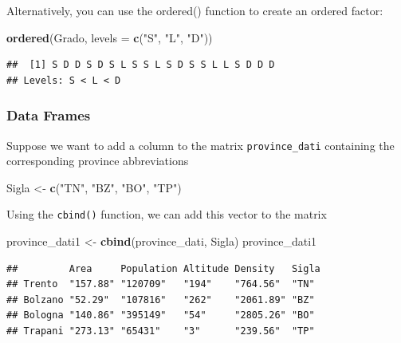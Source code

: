 \documentclass[
]{article}
\newenvironment{Shaded}{\begin{snugshade}}{\end{snugshade}}
\newcommand{\AttributeTok}[1]{\textcolor[rgb]{0.13,0.29,0.53}{#1}}
\newcommand{\FunctionTok}[1]{\textcolor[rgb]{0.13,0.29,0.53}{\textbf{#1}}}
\newcommand{\NormalTok}[1]{#1}
\newcommand{\OtherTok}[1]{\textcolor[rgb]{0.56,0.35,0.01}{#1}}
\newcommand{\StringTok}[1]{\textcolor[rgb]{0.31,0.60,0.02}{#1}}
\begin{document}
Alternatively, you can use the ordered() function to create an ordered
factor:

\begin{Shaded}
\begin{Highlighting}[]
\FunctionTok{ordered}\NormalTok{(Grado, }\AttributeTok{levels =} \FunctionTok{c}\NormalTok{(}\StringTok{"S"}\NormalTok{, }\StringTok{"L"}\NormalTok{, }\StringTok{"D"}\NormalTok{))}
\end{Highlighting}
\end{Shaded}

\begin{verbatim}
##  [1] S D D S D S L S S L S D S S L L S D D D
## Levels: S < L < D
\end{verbatim}

\hypertarget{data-frames}{%
\subsubsection{Data Frames}\label{data-frames}}

Suppose we want to add a column to the matrix \texttt{province\_dati}
containing the corresponding province abbreviations

\begin{Shaded}
\begin{Highlighting}[]
\NormalTok{Sigla }\OtherTok{\textless{}{-}} \FunctionTok{c}\NormalTok{(}\StringTok{"TN"}\NormalTok{, }\StringTok{"BZ"}\NormalTok{, }\StringTok{"BO"}\NormalTok{, }\StringTok{"TP"}\NormalTok{)}
\end{Highlighting}
\end{Shaded}

Using the \texttt{cbind()} function, we can add this vector to the
matrix

\begin{Shaded}
\begin{Highlighting}[]
\NormalTok{province\_dati1 }\OtherTok{\textless{}{-}} \FunctionTok{cbind}\NormalTok{(province\_dati, Sigla)}
\NormalTok{province\_dati1}
\end{Highlighting}
\end{Shaded}

\begin{verbatim}
##         Area     Population Altitude Density   Sigla
## Trento  "157.88" "120709"   "194"    "764.56"  "TN" 
## Bolzano "52.29"  "107816"   "262"    "2061.89" "BZ" 
## Bologna "140.86" "395149"   "54"     "2805.26" "BO" 
## Trapani "273.13" "65431"    "3"      "239.56"  "TP"
\end{verbatim}
\end{document}
